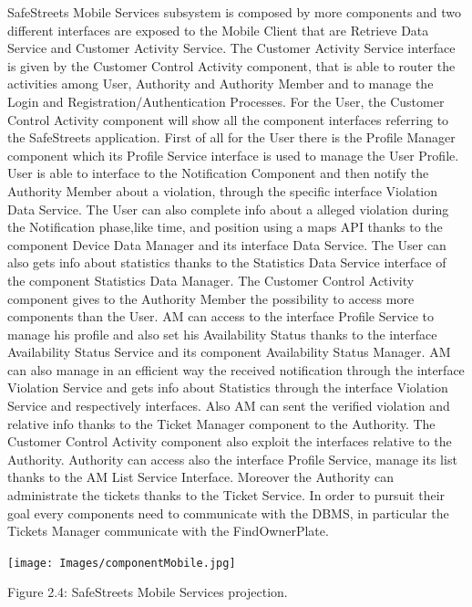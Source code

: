 \documentclass[12pt]{article}
\begin{document}
SafeStreets Mobile Services subsystem is composed by more components and two different interfaces are exposed to the Mobile Client that are Retrieve Data Service and Customer Activity Service. The Customer Activity Service interface is given by the  Customer Control Activity component, that is able to router the activities among User, Authority and Authority Member and to manage the Login and Registration/Authentication Processes. For the User, the Customer Control Activity component will show all the component interfaces referring to the SafeStreets application. First of all for the User there is the Profile Manager component which its Profile Service interface is used to manage the User Profile. User is able to interface to the Notification Component and then notify the Authority Member about a violation, through the specific interface Violation Data Service. The User can also complete  info about a alleged violation during the Notification phase,like time, and position using a maps API thanks to the component Device Data Manager and its interface Data Service. The User can also gets info about statistics thanks to the Statistics Data Service interface of the component Statistics Data Manager. The Customer Control Activity component gives to the Authority Member the possibility to access more components than the User. AM can access to the interface Profile Service to manage his profile and also set his Availability Status thanks to the interface Availability Status Service and its component Availability Status Manager. AM can also manage in an efficient way the received notification through the interface Violation Service and gets info about Statistics through the interface Violation Service and respectively interfaces. Also AM can sent the verified violation and relative info thanks to the Ticket Manager component to the Authority. The Customer Control Activity component also exploit the interfaces relative to the Authority. Authority can access also the interface Profile Service, manage its list thanks to the AM List Service Interface. Moreover the Authority can administrate the tickets thanks to the Ticket Service.
In order to pursuit their goal every components need to communicate with the DBMS, in particular the Tickets Manager communicate with the FindOwnerPlate.

\begin{center}
\texttt{[image: Images/componentMobile.jpg]}

\vspace{2mm}
Figure 2.4: SafeStreets Mobile Services projection.
\end{center}
\end{document}
